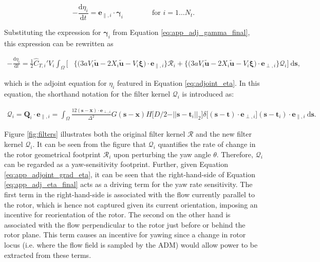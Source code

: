 \documentclass[energies,article,submit,moreauthors,latex,10pt,a4paper]{mdpi}
\newcommand{\ds}{~\text{d}\boldsymbol{s}}
\newcommand{\bs}[1]{\boldsymbol{#1}}
\newcommand{\ddt}[1]{\frac{\text{d} #1}{\text{d} t}}
\newcommand{\sint}{\int_{\Omega}}
\newcommand{\utilde}{\widetilde{\bs{u}}}
\newcommand{\ctihat}{\widehat{C}_{T,i}'}
\newcommand{\R}{\mathscr{R}}
\newcommand{\eperpi}{\bs{e}_{\perp,i}}
\newcommand{\etransi}{\bs{e}_{\parallel,i}}
\newcommand{\diracdelta}{{\delta}}
\begin{document}
\begin{equation}\label{eq:app_adj_eta_basic}
- \ddt{\eta_i} = \bs{e}_{\parallel,i} \cdot \bs{\gamma}_i 
\qquad\qquad \text{for } i=1\dots N_t.
\end{equation}

\noindent Substituting the expression for $\bs{\gamma}_i$ from Equation \eqref{eq:app_adj_gamma_final}, this expression can be rewritten as 

\begin{align}
- \ddt{\eta_i} =  \frac{1}{2} \ctihat V_i \sint \bigg[ & \bigg\{ \bigg(3a V_i \utilde  - 2 X_i \utilde - V_i\bs{\xi} \bigg) \cdot \etransi   \bigg\} \R_i + \bigg\{ \bigg(3aV_i \utilde  -2 X_i \utilde - V_i\bs{\xi} \bigg) \cdot \eperpi \bigg\} \mathscr{Q}_i \bigg] \ds, \label{eq:app_adj_eta_final} 
\end{align}

\noindent which is the adjoint equation for $\eta_i$ featured in Equation \eqref{eq:adjoint_eta}. In this equation, the shorthand notation for the filter kernel $\mathscr{Q}_i$ is introduced as:

\begin{align}
\mathscr{Q}_i = \bs{Q}_i \cdot \etransi = \sint \frac{12 (\bs{s} - \bs{x})\cdot \eperpi}{\Delta^2} G(\bs{s} - \bs{x})  H\big[D/2 - \vert\vert \bs{s} - \bs{t}_i \vert\vert_2 \big] \diracdelta\big[(\bs{s} - \bs{t})\cdot \eperpi \big]  (\bs{s} - \bs{t}_i) \cdot \etransi \ds.
\end{align}

\noindent Figure \ref{fig:filters} illustrates both the original filter kernel $\R$ and the new filter kernel $\mathscr{Q}_i$. It can be seen from the figure that $\mathscr{Q}_i$ quantifies the rate of change in the rotor geometrical footprint $\R_i$ upon perturbing the yaw angle $\theta$. Therefore, $\mathscr{Q}_i$ can be regarded as a yaw-sensitivity footprint.
Further, given Equation \eqref{eq:app_adjoint_grad_eta}, it can be seen that the right-hand-side of Equation \eqref{eq:app_adj_eta_final} acts as a driving term for the yaw rate sensitivity. The first term in the right-hand-side is associated with the flow currently parallel to the rotor, which is hence not captured given its current orientation, imposing an incentive for reorientation of the rotor. The second on the other hand is associated with the flow perpendicular to the rotor just before or behind the rotor plane. This term causes an incentive for yawing since a change in rotor locus (i.e. where the flow field is sampled by the ADM) would allow power to be extracted from these terms. 
\end{document}
